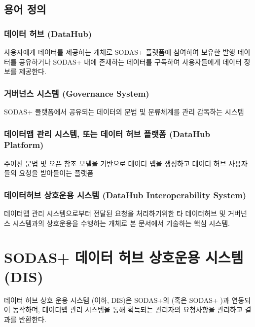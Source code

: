 \documentclass[a4paper,10pt,english]{sphinxmanual}
\begin{document}
\begin{DUlineblock}{0em}
\item[] 
\item[] 
\end{DUlineblock}


\section{용어 정의}
\label{\detokenize{intro_sodas:id2}}

\subsection{데이터 허브 (DataHub)}
\label{\detokenize{intro_sodas:datahub}}
\sphinxAtStartPar
사용자에게 데이터를 제공하는 개체로 SODAS+ 플랫폼에 참여하여 보유한 발행 데이터를 공유하거나
SODAS+ 내에 존재하는 데이터를 구독하여 사용자들에게 데이터 정보를 제공한다.


\subsection{거버넌스 시스템 (Governance System)}
\label{\detokenize{intro_sodas:governance-system}}
\sphinxAtStartPar
SODAS+ 플랫폼에서 공유되는 데이터의 문법 및 분류체계를 관리 감독하는 시스템


\subsection{데이터맵 관리 시스템, 또는 데이터 허브 플랫폼 (DataHub Platform)}
\label{\detokenize{intro_sodas:datahub-platform}}
\sphinxAtStartPar
주어진 문법 및 오픈 참조 모델을 기반으로 데이터 맵을 생성하고 데이터 허브 사용자들의 요청을 받아들이는 플랫폼


\subsection{데이터허브 상호운용 시스템 (DataHub Interoperability System)}
\label{\detokenize{intro_sodas:datahub-interoperability-system}}
\sphinxAtStartPar
데이터맵 관리 시스템으로부터 전달된 요청을 처리하기위한 타 데이터허브 및 거버넌스 시스템과의 상호운용을 수행하는 개체로
본 문서에서 기술하는 핵심 시스템.

\sphinxstepscope


\chapter{SODAS+ 데이터 허브 상호운용 시스템 (DIS)}
\label{\detokenize{intro:sodas-dis}}\label{\detokenize{intro::doc}}
\sphinxAtStartPar
데이터 허브 상호 운용 시스템 (이하, DIS)은 SODAS+의  (혹은 SODAS+ )과 연동되어 동작하며,
데이터맵 관리 시스템을 통해 획득되는 관리자의 요청사항을 관리하고 결과를 반환한다.
\end{document}
